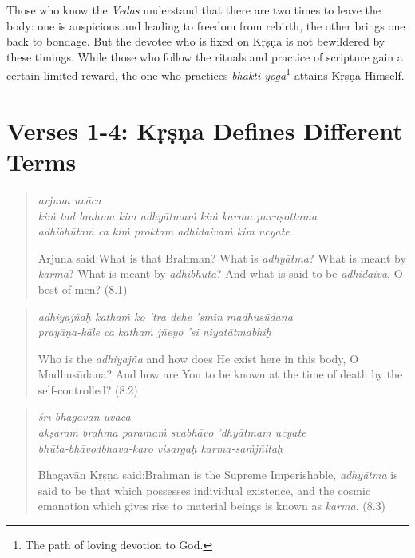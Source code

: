 \documentclass[12pt, twoside, openright]{memoir}
\begin{document}
Those who know the \textit{Vedas} understand that there are two times to leave the body: one is auspicious and leading to freedom from rebirth, the other brings one back to bondage. But the devotee who is fixed on Kṛṣṇa is not bewildered by these timings. While those who follow the rituals and practice of scripture gain a certain limited reward, the one who practices \textit{bhakti-yoga}\footnote{The path of loving devotion to God.} attains Kṛṣṇa Himself.

\section{Verses 1-4: Kṛṣṇa Defines Different Terms}\label{sec-verses-1-4-krsna-defines-different-terms}


\par
\begin{verse}
\textit{arjuna uvāca} \\
\textit{kiṁ tad brahma kim adhyātmaṁ kiṁ karma puruṣottama} \\
\textit{adhibhūtaṁ ca kiṁ proktam adhidaivaṁ kim ucyate}

\noindent \quad Arjuna said:\linebreak What is that Brahman? What is \textit{adhyātma}? What is meant by \textit{karma}? What is meant by \textit{adhibhūta}? And what is said to be \textit{adhidaiva}, O best of men? (8.1)
\end{verse}
\par



\par
\begin{verse}
\textit{adhiyajñaḥ kathaṁ ko ’tra dehe ’smin madhusūdana} \\
\textit{prayāṇa-kāle ca kathaṁ jñeyo ’si niyatātmabhiḥ}

\noindent Who is the \textit{adhiyajña} and how does He exist here in this body, O Madhusūdana? And how are You to be known at the time of death by the self-controlled? (8.2)
\end{verse}
\par



\par
\begin{verse}
\textit{śrī-bhagavān uvāca} \\
\textit{akṣaraṁ brahma paramaṁ svabhāvo ’dhyātmam ucyate} \\
\textit{bhūta-bhāvodbhava-karo visargaḥ karma-saṁjñitaḥ}

\noindent \quad Bhagavān Kṛṣṇa said:\linebreak Brahman is the Supreme Imperishable, \textit{adhyātma} is said to be that which possesses individual existence, and the cosmic emanation which gives rise to material beings is known as \textit{karma}. (8.3)
\end{verse}
\par
\end{document}
